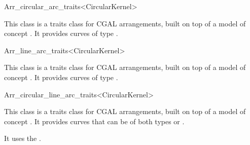 \begin{ccRefClass}{Arr_circular_arc_traits<CircularKernel>}


\ccDefinition

This class is a traits class for CGAL arrangements, built on top of a model of 
concept .
It provides curves of type .

\ccIsModel
{}

\end{ccRefClass}
\begin{ccRefClass}{Arr_line_arc_traits<CircularKernel>}


\ccDefinition

This class is a traits class for CGAL arrangements, built on top of a
model of concept .  It provides curves of type
.

\ccIsModel
{}

\end{ccRefClass}
\begin{ccRefClass}{Arr_circular_line_arc_traits<CircularKernel>}


\ccDefinition

This class is a traits class for CGAL arrangements, built on top of a
model of concept . It provides curves that can be
of both types
 or 
.

It uses the . 

\ccIsModel
{}

\end{ccRefClass}
